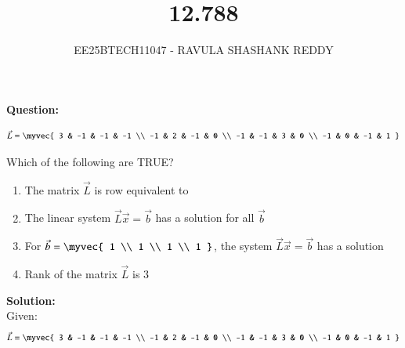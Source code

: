 \documentclass[journal]{article}
\begin{document}
	
	
	\vspace{3cm}
	
\title{12.788}
\author{EE25BTECH11047 - RAVULA SHASHANK REDDY}
\maketitle
\hrulefill
\bigskip 

\renewcommand{\thetable}{\theenumi}
\setlength{\intextsep}{10pt}

\textbf{Question:} 

\begin{align*}
\vec{L} = 
\myvec{
3 & -1 & -1 & -1 \\
-1 & 2 & -1 & 0 \\
-1 & -1 & 3 & 0 \\
-1 & 0 & -1 & 1
}
\end{align*}

Which of the following are TRUE? 


\begin{enumerate}[label=\alph*)]
\item The matrix $\vec{L}$ is row equivalent to 

\item The linear system $\vec{L}\vec{x} = \vec{b}$ has a solution for all $\vec{b}$

\item For $\vec{b} = 
\myvec{
1 \\ 1 \\ 1 \\ 1
}$, the system $\vec{L}\vec{x} = \vec{b}$ has a solution

\item Rank of the matrix $\vec{L}$ is $3$
\end{enumerate}

\textbf{Solution:}\\

Given:
\begin{align} 
\vec{L} = 
\myvec{
3 & -1 & -1 & -1 \\
-1 & 2 & -1 & 0 \\
-1 & -1 & 3 & 0 \\
-1 & 0 & -1 & 1
} 
\end{align}

\newpage
\end{document}
